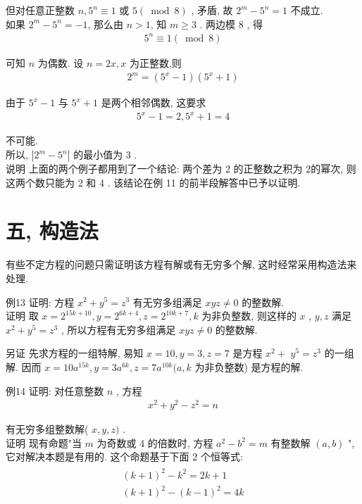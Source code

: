 	但对任意正整数 $n, 5^{n} \equiv 1$ 或 $5(\bmod 8)$ , 矛盾, 故 $2^{m}-5^{n}=1$ 不成立. \\
	如果 $2^{m}-5^{n}=-1$, 那么由 $n>1$, 知 $m \geqslant 3$ . 两边模 8 , 得
\begin{align*}
		5^{n} \equiv 1(\bmod 8)
	\end{align*}

	可知 $n$ 为偶数. 设 $n=2 x, x$ 为正整数,则
\begin{align*}
		2^{m}=\left(5^{x}-1\right)\left(5^{x}+1\right)
	\end{align*}

	由于 $5^{x}-1$ 与 $5^{x}+1$ 是两个相邻偶数, 这要求
\begin{align*}
		5^{x}-1=2,5^{x}+1=4
	\end{align*}

	不可能.\\
	所以,  $\left|2^{m}-5^{n}\right|$ 的最小值为 3 . \\
	说明 上面的两个例子都用到了一个结论: 两个差为 2 的正整数之积为 2的幂次, 则这两个数只能为 2 和 4 . 该结论在例 11 的前半段解答中已予以证明.

	\section{五, 构造法}
	有些不定方程的问题只需证明该方程有解或有无穷多个解, 这时经常采用构造法来处理.

	例13 证明: 方程 $x^{2}+y^{5}=z^{3}$ 有无穷多组满足 $x y z \neq 0$ 的整数解. \\
	证明 取 $x=2^{15 k+10}, y=2^{6 k+4}, z=2^{10 k+7}, k$ 为非负整数, 则这样的 $x$ ,  $y ,  z$ 满足 $x^{2}+y^{5}=z^{3}$ , 所以方程有无穷多组满足 $x y z \neq 0$ 的整数解.

	另证 先求方程的一组特解, 易知 $x=10 ,  y=3 ,  z=7$ 是方程 $x^{2}+$ $y^{5}=z^{3}$ 的一组解. 因而 $x=10 a^{15 k}, y=3 a^{6 k}, z=7 a^{10 k}(a, k$ 为非负整数) 是方程的解.

	例14 证明: 对任意整数 $n$ , 方程
\begin{align*}
		x^{2}+y^{2}-z^{2}=n
	\end{align*}

	有无穷多组整数解( $x, y, z)$ . \\
	证明 现有命题"当 $m$ 为奇数或 4 的倍数时, 方程 $a^{2}-b^{2}=m$ 有整数解 $(a, b)$ ", 它对解决本题是有用的. 这个命题基于下面 2 个恒等式:
\begin{align*}
		\begin{gathered}
			(k+1)^{2}-k^{2}=2 k+1 \\
			(k+1)^{2}-(k-1)^{2}=4 k
		\end{gathered}
	\end{align*}

